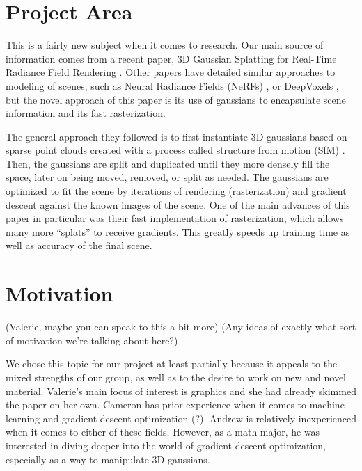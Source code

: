 \documentclass[12pt, a4paper, twocolumn]{article}
\begin{document}

\twocolumn[
  \begin{@twocolumnfalse}
    \maketitle
  \end{@twocolumnfalse}
]


\section{Project Area}
This is a fairly new subject when it comes to research.
Our main source of information comes from a recent paper,
3D Gaussian Splatting for Real-Time Radiance Field Rendering
\cite{kerbl20233d}. Other papers have detailed similar approaches to 
modeling of scenes, such as Neural Radiance Fields (NeRFs) \cite{barron2022mipnerf},
or DeepVoxels \cite{sitzmann2019deepvoxels}, but the novel
approach of this paper is its use of gaussians to encapsulate 
scene information and its fast rasterization.

The general approach they followed is to first instantiate 3D gaussians
based on sparse point clouds created with a process called structure from motion (SfM) \cite{Ko2016PointCG}.
Then, the gaussians are split and duplicated until they more densely fill the space,
later on being moved, removed, or split as needed. The gaussians are optimized
to fit the scene by iterations of rendering (rasterization) and gradient descent
against the known images of the scene. One of the main advances of this paper in particular
was their fast implementation of rasterization, which allows many more ``splats''
to receive gradients. This greatly speeds up training time as well as accuracy
of the final scene.

\section{Motivation}
(Valerie, maybe you can speak to this a bit more)
(Any ideas of exactly what sort of motivation we're talking about here?)

We chose this topic for our project at least partially because it appeals to the 
mixed strengths of our group, as well as to the desire to work on new and novel material.
Valerie's main focus of interest is graphics and she had already skimmed the paper on her own.
Cameron has prior experience when it comes to machine learning and gradient descent optimization (?).
Andrew is relatively inexperienced when it comes to either of these fields. However, as a math major,
he was interested in diving deeper into the world of gradient descent optimization, especially
as a way to manipulate 3D gaussians. 
\end{document}
